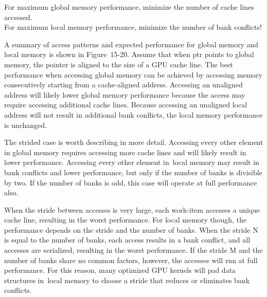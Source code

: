 \begin{tcolorbox}[colback=red!5!white,colframe=red!75!black]
For maximum global memory performance, minimize the number of cache lines accessed.\\
For maximum local memory performance, minimize the number of bank conflicts!
\end{tcolorbox}

A summary of access patterns and expected performance for global memory and local memory is shown in Figure 15-20. Assume that when ptr points to global memory, the pointer is aligned to the size of a GPU cache line. The best performance when accessing global memory can be achieved by accessing memory consecutively starting from a cache-aligned address. Accessing an unaligned address will likely lower global memory performance because the access may require accessing additional cache lines. Because accessing an unaligned local address will not result in additional bank conflicts, the local memory performance is unchanged.\par

The strided case is worth describing in more detail. Accessing every other element in global memory requires accessing more cache lines and will likely result in lower performance. Accessing every other element in local memory may result in bank conflicts and lower performance, but only if the number of banks is divisible by two. If the number of banks is odd, this case will operate at full performance also.\par

When the stride between accesses is very large, each work-item accesses a unique cache line, resulting in the worst performance. For local memory though, the performance depends on the stride and the number of banks. When the stride N is equal to the number of banks, each access results in a bank conflict, and all accesses are serialized, resulting in the worst performance. If the stride M and the number of banks share no common factors, however, the accesses will run at full performance. For this reason, many optimized GPU kernels will pad data structures in local memory to choose a stride that reduces or eliminates bank conflicts.\par

